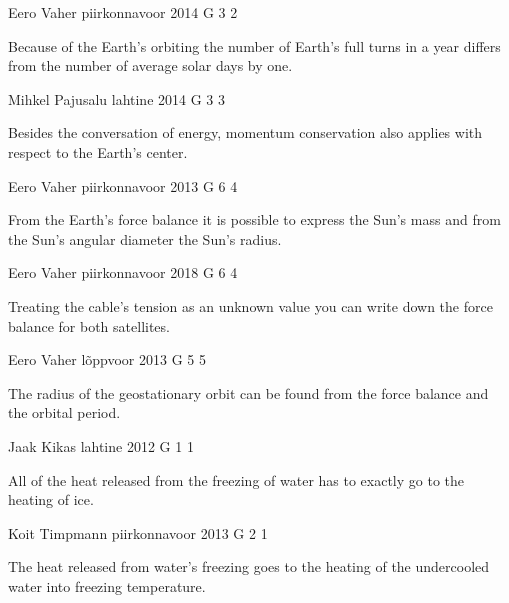 \documentclass[11pt]{article}
\begin{document}
{Eero Vaher} %
{piirkonnavoor} %
{2014} %
{G 3} %
{2} %
{

\ifEngHint
Because of the Earth’s orbiting the number of Earth’s full turns in a year differs from the number of average solar days by one.
\fi
}

{Mihkel Pajusalu} %
{lahtine} %
{2014} %
{G 3} %
{3} %
{

\ifEngHint
Besides the conversation of energy, momentum conservation also applies with respect to the Earth’s center.
\fi
}

{Eero Vaher} %
{piirkonnavoor} %
{2013} %
{G 6} %
{4} %
{

\ifEngHint
From the Earth’s force balance it is possible to express the Sun’s mass and from the Sun’s angular diameter the Sun’s radius.
\fi
}

{Eero Vaher} %
{piirkonnavoor} %
{2018} %
{G 6} %
{4} %
{

\ifEngHint
Treating the cable’s tension as an unknown value you can write down the force balance for both satellites.
\fi
}

{Eero Vaher} %
{lõppvoor} %
{2013} %
{G 5} %
{5} %
{

\ifEngHint
The radius of the geostationary orbit can be found from the force balance and the orbital period.
\fi
}

{Jaak Kikas} %
{lahtine} %
{2012} %
{G 1} %
{1} %
{

\ifEngHint
All of the heat released from the freezing of water has to exactly go to the heating of ice.
\fi
}

{Koit Timpmann} %
{piirkonnavoor} %
{2013} %
{G 2} %
{1} %
{

\ifEngHint
The heat released from water’s freezing goes to the heating of the undercooled water into freezing temperature.
\fi
}
\end{document}
